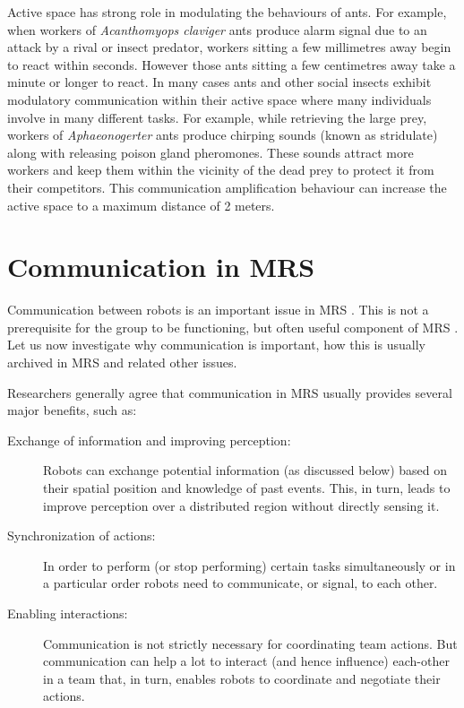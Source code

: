 Active space has strong role in modulating the behaviours of ants. For example, when workers of {\em Acanthomyops claviger} ants produce alarm signal due to an attack by a rival or insect predator, workers sitting a few millimetres away begin to react within seconds. However those ants sitting a few centimetres away take a minute or longer to react. In many cases ants and other social insects exhibit modulatory communication within their active space where many individuals involve in many different tasks. For example, while retrieving the large prey, workers of {\em Aphaeonogerter} ants produce chirping sounds (known as stridulate) along with releasing poison gland pheromones. These sounds attract more workers and keep them within the vicinity of the dead prey  to protect it from their competitors. This communication amplification behaviour can increase the active space to a maximum distance of 2 meters.
\section{Communication in MRS}
Communication between robots is an  important issue in MRS \cite{Arkin1998}. This is not a prerequisite for the group to be functioning, but often useful component of MRS \cite{Mataric2007}. Let us now investigate why communication is important, how this is usually archived in MRS and related other issues.

Researchers generally agree that communication in MRS usually provides several major benefits, such as:

\begin{description}
\item[Exchange of information and improving perception:]
Robots  can exchange potential information (as discussed below) based on their spatial position and knowledge of past events. This, in turn, leads to improve perception over a distributed region without directly sensing it.
\item[Synchronization of actions:]
In order to perform (or stop performing) certain tasks simultaneously or in a particular order robots need to communicate, or signal, to each other. 
\item[Enabling interactions:]
Communication is not strictly necessary for coordinating team actions. But  communication can help a lot to interact (and hence influence) each-other in a team that, in turn, enables robots to coordinate and negotiate their actions.
\end{description}

